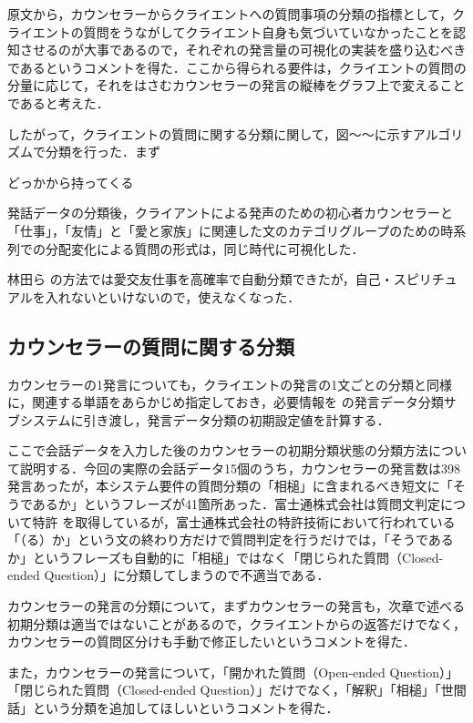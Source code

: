 \documentclass[shuuron]{kuee}
\begin{document}
原文から，カウンセラーからクライエントへの質問事項の分類の指標として，クライエントの質問をうながしてクライエント自身も気づいていなかったことを認知させるのが大事であるので，それぞれの発言量の可視化の実装を盛り込むべきであるというコメントを得た．ここから得られる要件は，クライエントの質問の分量に応じて，それをはさむカウンセラーの発言の縦棒をグラフ上で変えることであると考えた．

したがって，クライエントの質問に関する分類に関して，図〜〜に示すアルゴリズムで分類を行った．まず

どっかから持ってくる

発話データの分類後，クライアントによる発声のための初心者カウンセラーと「仕事」，「友情」と「愛と家族」に関連した文のカテゴリグループのための時系列での分配変化による質問の形式は，同じ時代に可視化した．

  林田ら\cite{hayashidaJp} \cite{hayashidaEn}の方法では愛交友仕事を高確率で自動分類できたが，自己・スピリチュアルを入れないといけないので，使えなくなった．

\subsection{カウンセラーの質問に関する分類} %

カウンセラーの1発言についても，クライエントの発言の1文ごとの分類と同様に，関連する単語をあらかじめ指定しておき，必要情報を
の発言データ分類サブシステムに引き渡し，発言データ分類の初期設定値を計算する．

ここで会話データを入力した後のカウンセラーの初期分類状態の分類方法について説明する．今回の実際の会話データ15個のうち，カウンセラーの発言数は398発言あったが，本システム要件の質問分類の「相槌」に含まれるべき短文に「そうであるか」というフレーズが41箇所あった．富士通株式会社は質問文判定について特許
\cite{tokkyo}
を取得しているが，富士通株式会社の特許技術において行われている「（る）か」という文の終わり方だけで質問判定を行うだけでは，「そうであるか」というフレーズも自動的に「相槌」ではなく「閉じられた質問（Closed-ended Question）」に分類してしまうので不適当である．

カウンセラーの発言の分類について，まずカウンセラーの発言も，次章で述べる初期分類は適当ではないことがあるので，クライエントからの返答だけでなく，カウンセラーの質問区分けも手動で修正したいというコメントを得た．

また，カウンセラーの発言について，「開かれた質問（Open-ended Question）」「閉じられた質問（Closed-ended Question）」だけでなく，「解釈」「相槌」「世間話」という分類を追加してほしいというコメントを得た．
\end{document}
